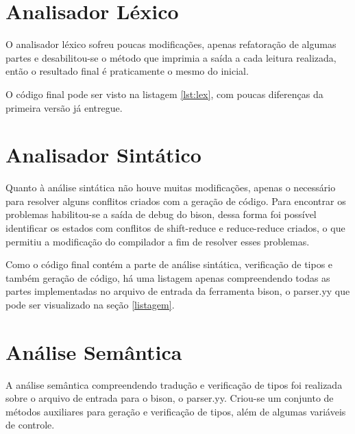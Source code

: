 \documentclass[12pt,a4paper]{article}
\begin{document}





\section{Analisador Léxico}

O analisador léxico sofreu poucas modificações, apenas refatoração de algumas partes e desabilitou-se o método que imprimia a saída a cada leitura realizada, então o resultado final é praticamente o mesmo do inicial.

O código final pode ser visto na listagem \ref{lst:lex}, com poucas diferenças da primeira versão já entregue.




\section{Analisador Sintático}

Quanto à análise sintática não houve muitas modificações, apenas o necessário para resolver alguns conflitos criados com a geração de código. Para encontrar os problemas habilitou-se a saída de debug do bison, dessa forma foi possível identificar os estados com conflitos de shift-reduce e reduce-reduce criados, o que permitiu a modificação do compilador a fim de resolver esses problemas.

Como o código final contém a parte de análise sintática, verificação de tipos e também geração de código, há uma listagem apenas compreendendo todas as partes implementadas no arquivo de entrada da ferramenta bison, o parser.yy que pode ser visualizado na seção \ref{listagem}.

\section{Análise Semântica}

A análise semântica compreendendo tradução e verificação de tipos foi realizada sobre o arquivo de entrada para o bison, o parser.yy. Criou-se um conjunto de métodos auxiliares para geração e verificação de tipos, além de algumas variáveis de controle.
\end{document}
